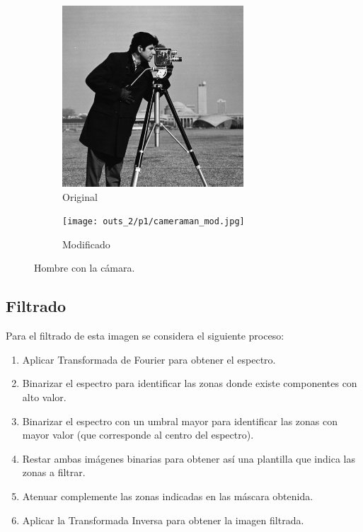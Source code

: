\documentclass[
  letterpaper,
  twocolumn,
  9pt,
  journal,
  final]{IEEEtran}
\begin{document}
\begin{figure}[!tbh]
	\centering

  \begin{subfigure}[b]{.49\linewidth}
		\includegraphics[width=\linewidth,]{cameraman.png}
		\caption{Original}
	\end{subfigure}
  \begin{subfigure}[b]{.49\linewidth}
    \texttt{[image: outs\_2/p1/cameraman\_mod.jpg]}
		\caption{Modificado}
	\end{subfigure}

  \caption{Hombre con la cámara.} \label{camaraman}
\end{figure}


\subsection{Filtrado}

Para el filtrado de esta imagen se considera el siguiente proceso:

\begin{enumerate}
	\item Aplicar Transformada de Fourier para obtener el espectro.
	\item Binarizar el espectro para identificar las zonas donde existe componentes con alto valor.
	\item Binarizar el espectro con un umbral mayor para identificar las zonas con mayor valor (que corresponde al centro del espectro).
	\item Restar ambas imágenes binarias para obtener así una plantilla que indica las zonas a filtrar.
	\item Atenuar complemente las zonas indicadas en las máscara obtenida.
	\item Aplicar la Transformada Inversa para obtener la imagen filtrada.
\end{enumerate}
\end{document}
